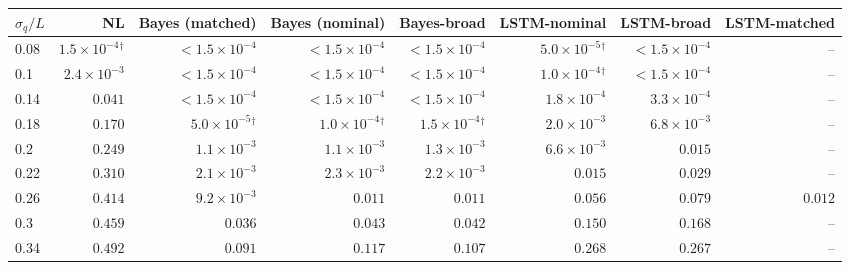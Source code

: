 \begin{tabular}{lrrrrrrr}
\toprule
$\sigma_q/L$ & NL & Bayes (matched) & Bayes (nominal) & Bayes-broad & LSTM-nominal & LSTM-broad & LSTM-matched \\
\midrule
0.08 & $1.5\!\times\!10^{-4}$$^\dagger$ & $<1.5\!\times\!10^{-4}$ & $<1.5\!\times\!10^{-4}$ & \textit{$<1.5\!\times\!10^{-4}$} & $5.0\!\times\!10^{-5}$$^\dagger$ & \textit{$<1.5\!\times\!10^{-4}$} & -- \\
0.1 & $2.4\!\times\!10^{-3}$ & $<1.5\!\times\!10^{-4}$ & $<1.5\!\times\!10^{-4}$ & \textit{$<1.5\!\times\!10^{-4}$} & $1.0\!\times\!10^{-4}$$^\dagger$ & \textit{$<1.5\!\times\!10^{-4}$} & -- \\
0.14 & $0.041$ & $<1.5\!\times\!10^{-4}$ & $<1.5\!\times\!10^{-4}$ & $<1.5\!\times\!10^{-4}$ & $1.8\!\times\!10^{-4}$ & $3.3\!\times\!10^{-4}$ & -- \\
0.18 & $0.170$ & $5.0\!\times\!10^{-5}$$^\dagger$ & $1.0\!\times\!10^{-4}$$^\dagger$ & $1.5\!\times\!10^{-4}$$^\dagger$ & $2.0\!\times\!10^{-3}$ & $6.8\!\times\!10^{-3}$ & -- \\
0.2 & $0.249$ & $1.1\!\times\!10^{-3}$ & $1.1\!\times\!10^{-3}$ & $1.3\!\times\!10^{-3}$ & $6.6\!\times\!10^{-3}$ & $0.015$ & -- \\
0.22 & $0.310$ & $2.1\!\times\!10^{-3}$ & $2.3\!\times\!10^{-3}$ & $2.2\!\times\!10^{-3}$ & $0.015$ & $0.029$ & -- \\
0.26 & $0.414$ & $9.2\!\times\!10^{-3}$ & $0.011$ & $0.011$ & $0.056$ & $0.079$ & $0.012$ \\
0.3 & $0.459$ & $0.036$ & $0.043$ & \textit{$0.042$} & $0.150$ & \textit{$0.168$} & -- \\
0.34 & $0.492$ & $0.091$ & $0.117$ & \textit{$0.107$} & $0.268$ & \textit{$0.267$} & -- \\
\bottomrule
\end{tabular}